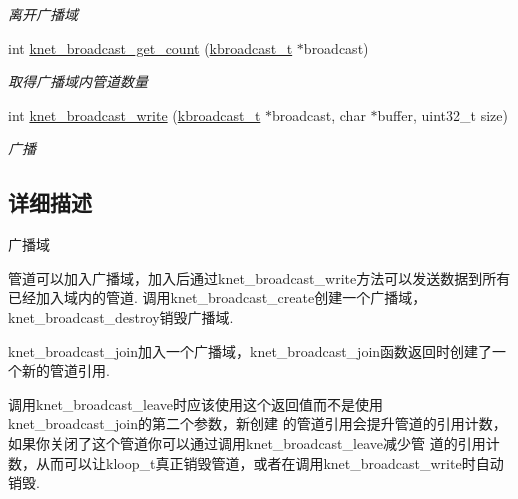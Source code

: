 \begin{DoxyCompactItemize}
\begin{DoxyCompactList}\small\item\em 离开广播域 \end{DoxyCompactList}\item 
int \hyperlink{a00101_gabf0b20b2490b3508e58a77314812f1a5_gabf0b20b2490b3508e58a77314812f1a5}{knet\+\_\+broadcast\+\_\+get\+\_\+count} (\hyperlink{a00051_a1b551151864af85fa6cce57058153d04_a1b551151864af85fa6cce57058153d04}{kbroadcast\+\_\+t} $\ast$broadcast)
\begin{DoxyCompactList}\small\item\em 取得广播域内管道数量 \end{DoxyCompactList}\item 
int \hyperlink{a00101_gafd3ac5d785687d729047a51724104060_gafd3ac5d785687d729047a51724104060}{knet\+\_\+broadcast\+\_\+write} (\hyperlink{a00051_a1b551151864af85fa6cce57058153d04_a1b551151864af85fa6cce57058153d04}{kbroadcast\+\_\+t} $\ast$broadcast, char $\ast$buffer, uint32\+\_\+t size)
\begin{DoxyCompactList}\small\item\em 广播 \end{DoxyCompactList}\end{DoxyCompactItemize}


\subsection{详细描述}
广播域 


\begin{DoxyPre}
管道可以加入广播域，加入后通过knet\_broadcast\_write方法可以发送数据到所有已经加入域内的管道.
调用knet\_broadcast\_create创建一个广播域，knet\_broadcast\_destroy销毁广播域.\end{DoxyPre}



\begin{DoxyPre}knet\_broadcast\_join加入一个广播域，knet\_broadcast\_join函数返回时创建了一个新的管道引用.\end{DoxyPre}



\begin{DoxyPre}调用knet\_broadcast\_leave时应该使用这个返回值而不是使用knet\_broadcast\_join的第二个参数，新创建
的管道引用会提升管道的引用计数，如果你关闭了这个管道你可以通过调用knet\_broadcast\_leave减少管
道的引用计数，从而可以让kloop\_t真正销毁管道，或者在调用knet\_broadcast\_write时自动销毁.\end{DoxyPre}



